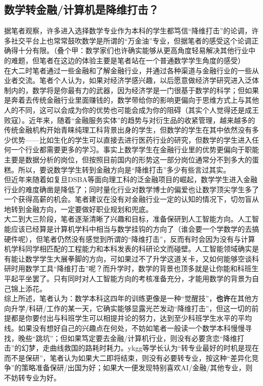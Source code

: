 \documentclass[a4paper,11pt,notitlepage]{article}
\newcommand{\empha}[1]{\textbf{#1}}
\begin{document}
\subsection{数学转金融/计算机是降维打击？}
据笔者观察，许多进入选择数学专业作为本科的学生都笃信“降维打击”的论调，许多社交平台上也常常鼓吹数学是所谓的“万金油”专业，但据笔者的感受这个论调正确得十分有限。（叠个甲：数学家们也许确实能够从更高角度轻易解决其他行业中的难题，但笔者在这边的体验主要是笔者站在一个普通数学学生角度的感受）\\
\indent 在大二时笔者通过一些金融和了解金融行业，并通过各种渠道与金融行业的一些从业者交流。笔者个人认为，如果对经济学感兴趣，以后愿意做经济学研究进入泛体制内的，数学将是你最有力的武器，因为经济学是一门很基于数学的科学；但如果是奔着去传统金融行业里面赚钱的，数学带给你的影响更偏向于思维方式上与其他人的不同，这可以会成为你的优势也可能会成为你的阻碍（其实个人觉得还是成王败寇）。近年来，随着“金融服务实体”的趋势与对衍生品的收紧管理，越来越多的传统金融机构开始青睐纯理工科背景出身的学生，但数学的学生在其中依然没有多少优势——比如生化的学生可以直接去进行医药行业的研究，但数学的学生进入任何一个行业都需要更多的学习。事实上数学学生在金融行业里的优势更偏向于职能主要是数据分析的岗位，但按照目前国内的形势这一部分岗位通常分不到多大的蛋糕。所以，要说数学学生转到金融方向是“降维打击”多少有些言过其实。\\
\indent 但近年来随着如复旦DSBA等面向理工科的泛金融项目的崛起，数学学生进入金融行业的难度确凿是降低了；同时量化行业对数学博士的偏爱也让数学顶尖学生多了一个获得高薪的机会。笔者建议在没有对金融行业一定的认知的情况下，切勿盲从地转到金融方向，一定要做好职业规划和兜底。\\
\indent 大二到大三阶段，笔者逐渐清晰了兴趣和目标，准备保研到人工智能方向。人工智能应该已经算是计算机学科中相当与数学挂钩的方向了（谁会要一个学数学的去搞硬件呢），但笔者仍然没有感觉到所谓的“降维打击”，反而有时会因为没有与计算机学科同学相匹配的工程能力和本科发表的科研论文而碰壁。人工智能领域确实是有能让数学学生大展拳脚的方向，可如果过不了升学这道关卡，又如何能够空谈科研时用数学工具“降维打击”呢？而升学时，数学的背景也顶多就是让你能和科班生平起平坐罢了。只有同时对人工智能方向的考核准备充分，才能用数学的背景为自己锦上添花。\\
\indent 综上所述，笔者认为：数学本科这四年的训练更像是一种“觉醒技”，\empha{也许}在其他方向升学/科研/工作的某一天，它确实能够显露光芒发动“降维打击”，但这一切的前提都是你要付出与科班学生可以相提并论的努力，达到至少科班学生水平的平均线。如果没有想好自己的兴趣点在何处，不妨如笔者一般读一个数学本科慢慢寻找，晚些“跳坑”；但如果笃定要去金融/计算机行业，则没有必要贪恋“降维打击”的幻梦，走曲线救国的路耗时耗力。ykgg等学长认为“转专业最好的时机是现在而不是保研”，笔者认为如果大二即将结束，则没有必要转专业，按这种“差异化竞争”的策略准备保研/出国为好；如果大一便发现特别喜欢AI/金融/其他专业，则不妨转专业为好。
\end{document}
